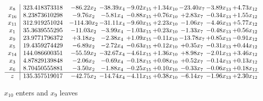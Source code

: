 \documentclass[9pt]{article}
\begin{document}
 \[\begin{array}{c| c c@{\hskip 2pt} c@{\hskip 2pt} c@{\hskip 2pt} c@{\hskip 2pt} c@{\hskip 2pt} c@{\hskip 2pt} c@{\hskip 2pt} }
 x_{8}   &  323.418373318 & -86.22 x_{2} & -38.39 x_{4} & -9.02 x_{15} & +  1.34 x_{10} & -23.40 x_{7} & -3.89 x_{13} & +  4.73 x_{12}\\
 x_{16}   &  8.23873610298 & -9.76 x_{2} & -5.81 x_{4} & -0.88 x_{15} & +  0.76 x_{10} & +  2.83 x_{7} & -0.34 x_{13} & +  1.55 x_{12}\\
 x_{11}   &  312.919251024 & -114.30 x_{2} & -31.11 x_{4} & -9.60 x_{15} & +  2.23 x_{10} & -1.06 x_{7} & -4.46 x_{13} & +  5.77 x_{12}\\
 x_{1}   &  35.3639555295 & -11.03 x_{2} & -3.99 x_{4} & -1.03 x_{15} & +  0.23 x_{10} & -1.33 x_{7} & -0.48 x_{13} & +  0.56 x_{12}\\
 x_{9}   &  23.9771796372 & +  3.18 x_{2} & -2.38 x_{4} & +  1.09 x_{15} & -0.11 x_{10} & -13.78 x_{7} & +  0.85 x_{13} & -0.91 x_{12}\\
 x_{5}   &  19.4359274429 & -6.89 x_{2} & -2.72 x_{4} & -0.63 x_{15} & +  0.12 x_{10} & +  0.35 x_{7} & -0.31 x_{13} & +  0.44 x_{12}\\
 x_{14}   &  144.086600351 & -55.59 x_{2} & -32.67 x_{4} & -4.61 x_{15} & +  1.36 x_{10} & +  8.98 x_{7} & -2.01 x_{13} & +  3.46 x_{12}\\
 x_{3}   &  4.87829139848 & -2.06 x_{2} & -0.69 x_{4} & -0.18 x_{15} & +  0.08 x_{10} & +  0.52 x_{7} & -0.14 x_{13} & +  0.13 x_{12}\\
 x_{6}   &  8.70450555881 & -3.50 x_{2} & -1.88 x_{4} & -0.25 x_{15} & +  0.10 x_{10} & -0.33 x_{7} & -0.06 x_{13} & +  0.18 x_{12}\\
\hline
z    &  135.357519017 & -42.75 x_{2} & -14.74 x_{4} & -4.11 x_{15} & +  0.38 x_{10} & -6.14 x_{7} & -1.96 x_{13} & +  2.30 x_{12}\\
\end{array}\]


 $ x_{10} $ enters and $ x_{9} $ leaves 
\end{document}
